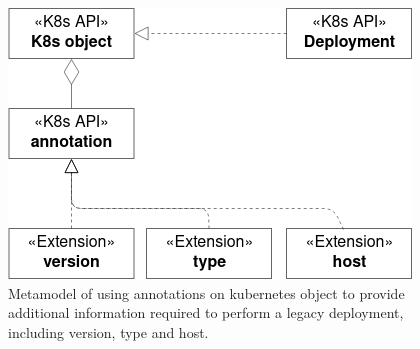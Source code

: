 \documentclass[../main.tex]{subfiles}
\begin{document}
    \begin{figure}[h]
        \centering
        \includegraphics[width=.7\linewidth]{img/concepts_metamodel_annotations_v2.png}
        \captionsetup{justification=centering}
        \caption{
            Metamodel of using annotations on \gls{kubernetes} object to provide additional information required to perform a legacy deployment, including version, type and host.
        }
        \label{fig:annotations_metamodel}
    \end{figure}
\end{document}
